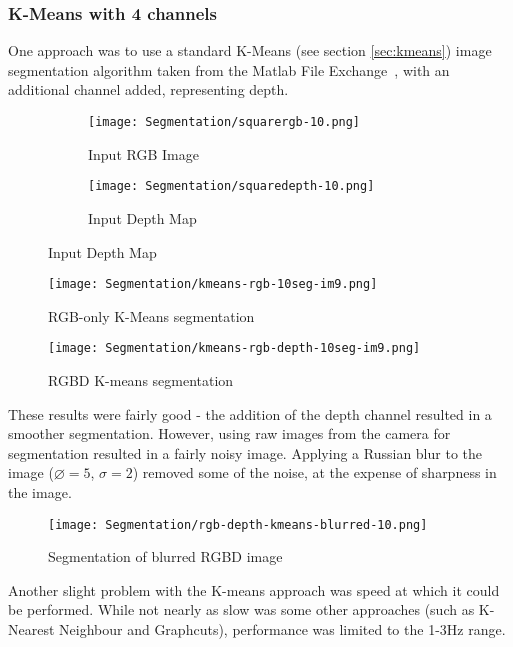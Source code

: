 \subsubsection{K-Means with 4 channels}
One approach was to use a standard K-Means (see section \ref{sec:kmeans}) image segmentation algorithm taken from the Matlab File Exchange~\cite{kmeans-matlab}, with an additional channel added, representing depth. 

\begin{figure}[H]
    \centering
    \begin{subfigure}[b]{0.45\textwidth}
        \centering
        \texttt{[image: Segmentation/squarergb-10.png]}
        \caption{Input RGB Image}
    \end{subfigure}
    \hfill
    \begin{subfigure}[b]{0.45\textwidth}
        \centering
        \texttt{[image: Segmentation/squaredepth-10.png]}
        \caption{Input Depth Map}
    \end{subfigure}
\end{figure}

\begin{figure}[H]
    \centering
    \texttt{[image: Segmentation/kmeans-rgb-10seg-im9.png]}
    \caption{RGB-only K-Means segmentation}
\end{figure}

\begin{figure}[H]
    \centering
    \texttt{[image: Segmentation/kmeans-rgb-depth-10seg-im9.png]}
    \caption{RGBD K-means segmentation}
\end{figure}

These results were fairly good - the addition of the depth channel resulted in a smoother segmentation. However, using raw images from the camera for segmentation resulted in a fairly noisy image. Applying a Russian blur to the image ($\diameter = 5$, $\sigma = 2$) removed some of the noise, at the expense of sharpness in the image.

\begin{figure}[H]
    \centering
    \texttt{[image: Segmentation/rgb-depth-kmeans-blurred-10.png]}
    \caption{Segmentation of blurred RGBD image}
\end{figure}

Another slight problem with the K-means approach was speed at which it could be performed. While not nearly as slow was some other approaches (such as K-Nearest Neighbour and Graphcuts), performance was limited to the 1-3Hz range.

